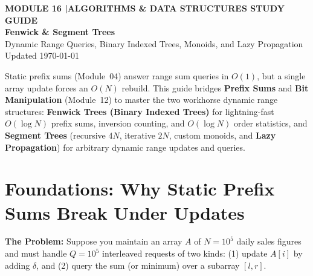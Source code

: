 \documentclass[11pt,a4paper]{article}
\newcommand{\sectionbreak}{}
\theoremstyle{definition}
\newcommand{\painbeat}{\textbf{\color{accentamber}The Problem:} }
\begin{document}
\thispagestyle{plain}
\begin{tcolorbox}[
    enhanced,
    colback=primaryblue!6, colframe=primaryblue!20,
    borderline west={5pt}{0pt}{primaryblue},
    arc=4pt, boxrule=0.6pt,
    left=14pt, right=14pt, top=7pt, bottom=7pt,
    before skip=0pt, after skip=5pt
]
    {\footnotesize\bfseries\color{accentteal}MODULE 16 \quad|\quad ALGORITHMS \& DATA STRUCTURES STUDY GUIDE}\\[3pt]
    {\Huge\bfseries\color{primaryblue}Fenwick \& Segment Trees}\\[3pt]
    {\large\color{codegray}Dynamic Range Queries, Binary Indexed Trees, Monoids, and Lazy Propagation}\\[4pt]
    {\footnotesize\color{codegray}Updated \today}
\end{tcolorbox}

\begin{overviewbox}
\small Static prefix sums (Module~04) answer range sum queries in $O(1)$, but a single array update forces an $O(N)$ rebuild. This guide bridges \textbf{Prefix Sums} and \textbf{Bit Manipulation} (Module~12) to master the two workhorse dynamic range structures: \textbf{Fenwick Trees (Binary Indexed Trees)} for lightning-fast $O(\log N)$ prefix sums, inversion counting, and $O(\log N)$ order statistics, and \textbf{Segment Trees} (recursive $4N$, iterative $2N$, custom monoids, and \textbf{Lazy Propagation}) for arbitrary dynamic range updates and queries.
\end{overviewbox}

\vspace{-6pt}
{\setlength{\parskip}{0pt}%
\let\oldaddvspace\addvspace%
\renewcommand{\addvspace}[1]{\oldaddvspace{0.18em plus 1pt}}%
\titlespacing*{\section}{0pt}{2pt}{6pt}%
\footnotesize\tableofcontents}

\renewcommand{\sectionbreak}{\clearpage}

\section{Foundations: Why Static Prefix Sums Break Under Updates}

\painbeat Suppose you maintain an array $A$ of $N = 10^5$ daily sales figures and must handle $Q = 10^5$ interleaved requests of two kinds: (1) update $A[i]$ by adding $\delta$, and (2) query the sum (or minimum) over a subarray $[l, r]$.
\end{document}
